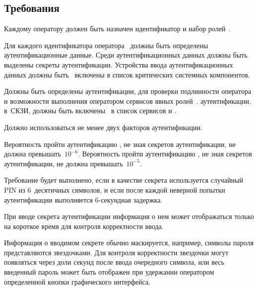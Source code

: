 \subsection{Требования}\label{IA.Reqs}

\label{R.IA.Id} %
Каждому оператору должен быть назначен идентификатор и набор 
ролей~.

\label{R.IA.AuthData} %
Для каждого идентификатора оператора~
должны быть определены аутентификационные данные. 
Среди аутентификационных данных должны быть выделены 
секреты аутентификации.
%
Устройства ввода аутентификационных данных должны быть~ 
включены в список критических системных компонентов. 

\label{R.IA.Auth} %
Должны быть определены  аутентификации, 
 для проверки подлинности оператора и возможности 
выполнения оператором сервисов явных ролей~.
%
 аутентификации,  в~СКЗИ,
должны быть включены~ в список сервисов
и .

\label{R.IA.2FA} %
Должно использоваться не менее двух факторов аутентификации.

\label{R.IA.AuthStrength} %
Вероятность пройти аутентификацию , 
не зная секретов аутентификации, 
не должна превышать~$10^{-6}$.
%
Вероятность пройти аутентификацию , 
не зная секретов аутентификации, 
не должна превышать~$10^{-5}$.

\begin{note}
Требование будет выполнено, если в качестве секрета используется случайный PIN
из $6$~десятичных символов, и если после каждой неверной попытки аутентификации
выполняется $6$-секундная задержка.
\end{note}

\label{R.IA.PwdMask} %
При вводе секрета аутентификации информация о нем может отображаться только на 
короткое время для контроля корректности ввода.

\begin{note}
Информация о вводимом секрете обычно маскируется, например, символы пароля
представляются звездочками. Для контроля корректности звездочки могут появляться
через доли секунд после ввода очередного символа, или весь 
введенный пароль может быть отображен при удержании оператором определенной 
кнопки графического интерфейса.
\end{note}

